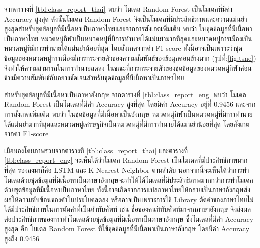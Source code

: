 \documentclass[12pt,oneside,openright,a4paper]{cpe-thai-project}
\begin{document}
      \hspace{1cm}จากตารางที่ \ref{tbl:class_report_thai} พบว่า โมเดล Random Forest เป็นโมเดลที่มีค่า Accuracy สูงสุด ดังนั้นโมเดล Random Forest
      จึงเป็นโมเดลที่มีประสิทธิภาพและความแม่นยำสูงสุดสำหรับชุดข้อมูลที่มีเนื้อหาเป็นภาษาไทยและจากการสังเกตเพิ่มเติม พบว่า ในชุดข้อมูลที่มีเนื้อหาเป็นภาษาไทย
      หมวดหมู่กีฬาเป็นหมวดหมู่ที่มีการทำนายได้แม่นยำมากที่สุดและหมวดหมู่การเมืองเป็นหมวดหมู่ที่มีการทำนายได้แม่นยำน้อยที่สุด โดยสังเกตจากค่า F1-score
      ทั้งนี้อาจเป็นเพราะว่าชุดข้อมูลของหมวดหมู่การเมืองมีการกระจายตัวของความสัมพันธ์ของข้อมูลค่อนข้างมาก (รูปที่:\ref{fig:tsne}) 
      จึงทำให้ความสามารถในการทำนายลดลง ในขณะที่การกระจายตัวของชุดข้อมูลของหมวดหมู่กีฬาค่อนข้างมีความสัมพันธ์กันอย่างชัดเจนสำหรับชุดข้อมูลที่มีเนื้อหาเป็นภาษาไทย 

      \hspace{1cm}สำหรับชุดข้อมูลที่มีเนื้อหาเป็นภาษาอังกฤษ จากตารางที่ \ref{tbl:class_report_eng} พบว่า โมเดล Random Forest 
      เป็นโมเดลที่มีค่า Accuracy สูงที่สุด โดยมีค่า Accuracy อยู่ที่ 0.9456 และจากการสังเกตเพิ่มเติม พบว่า ในชุดข้อมูลที่มีเนื้อหาเป็นอังกฤษ
      หมวดหมู่กีฬาเป็นหมวดหมู่ที่มีการทำนายได้แม่นยำมากที่สุดและหมวดหมู่เศรษฐกิจเป็นหมวดหมู่ที่มีการทำนายได้แม่นยำน้อยที่สุด โดยสังเกตจากค่า F1-score
      
      \hspace{1cm}เมื่อมองโดยภาพรวมจากตารางที่ \ref{tbl:class_report_thai} และตารางที่ \ref{tbl:class_report_eng} 
      จะเห็นได้ว่าโมเดล Random Forest เป็นโมเดลที่มีประสิทธิภาพมากที่สุด รองลงมาก็คือ LSTM และ K-Nearest Neighbor ตามลำดับ
      นอกจากนี้จะเห็นได้ว่าการทำโมเดลด้วยชุดข้อมูลที่มีเนื้อหาเป็นภาษาอังกฤษจะทำให้ได้โมเดลที่มีประสิทธิภาพมากกว่าการทำโมเดลด้วยชุดข้อมูลที่มีเนื้อหาเป็นภาษาไทย 
      ทั้งนี้อาจเกิดจากการแปลภาษาไทยให้กลายเป็นภาษาอังกฤษส่งผลให้ความซับซ้อนของคำในประโยคลดลง 
      หรืออาจเป็นเพราะการใช้ Library ตัดคำของภาษาไทยไม่ได้มีประสิทธิภาพในการตัดคำที่เป็นคำทับศัพท์ เช่น ชื่อของคนที่ทับศัพท์มาจากภาษาอังกฤษ 
      จึงส่งผลต่อประสิทธิภาพของการทำโมเดลด้วยชุดข้อมูลที่มีเนื้อหาเป็นภาษาอังกฤษ
      ซึ่งโมเดลที่มีค่า Accuracy สูงสุด คือ โมเดล Random Forest ที่ใช้ชุดข้อมูลที่มีเนื้อหาเป็นภาษาอังกฤษ โดยมีค่า Accuracy สูงถึง 0.9456
      \newpage
\end{document}
